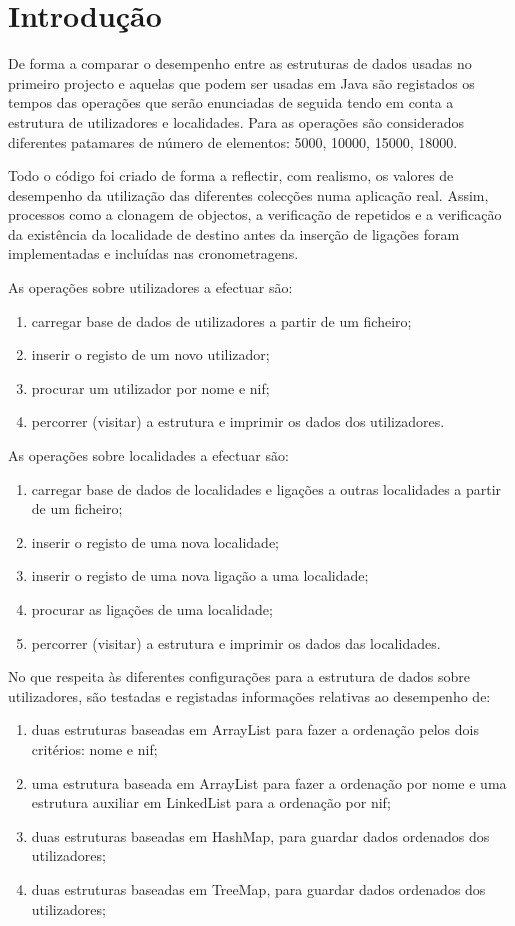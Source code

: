 \documentclass[a5paper,twocolumn, 11pt]{article}
\begin{document}
\clearpage
\section{Introdução}
De forma a comparar o desempenho entre as estruturas de dados usadas no primeiro projecto e aquelas que podem ser usadas em Java são registados os tempos das operações que serão enunciadas de seguida tendo em conta a  estrutura de utilizadores e localidades. Para as operações são considerados diferentes patamares de número de elementos: 5000, 10000, 15000, 18000.

Todo o código foi criado de forma a reflectir, com realismo, os valores de desempenho da utilização das diferentes colecções numa aplicação real. Assim, processos como a clonagem de objectos, a verificação de repetidos e a verificação da existência da localidade de destino antes da inserção de ligações foram implementadas e incluídas nas cronometragens.

As operações sobre utilizadores a efectuar são:
\begin{enumerate}
    \item{carregar base de dados de utilizadores a partir de um ficheiro;}
    \item{inserir o registo de um novo utilizador;}
    \item{procurar um utilizador por nome e nif;}
    \item{percorrer (visitar) a estrutura e imprimir os dados dos utilizadores.}
\end{enumerate}

As operações sobre localidades a efectuar são:
\begin{enumerate}
    \item{carregar base de dados de localidades e ligações a outras localidades a
partir de um ficheiro;}
    \item{inserir o registo de uma nova localidade;}
    \item{inserir o registo de uma nova ligação a uma localidade;}
    \item{procurar as ligações de uma localidade;}
    \item{percorrer (visitar) a estrutura e imprimir os dados das localidades.}
\end{enumerate}

No que respeita às diferentes configurações para a estrutura de dados sobre utilizadores, são testadas e registadas informações relativas ao desempenho de:
\begin{enumerate}
    \item{duas estruturas baseadas em ArrayList para fazer a ordenação pelos
dois critérios: nome e nif;}
    \item{uma estrutura baseada em ArrayList para fazer a ordenação por nome
e uma estrutura auxiliar em LinkedList para a ordenação por nif;}
    \item{duas estruturas baseadas em HashMap, para guardar dados ordenados dos utilizadores;}
    \item{duas estruturas baseadas em TreeMap, para guardar dados ordenados dos utilizadores;}
\end{enumerate}
\end{document}
